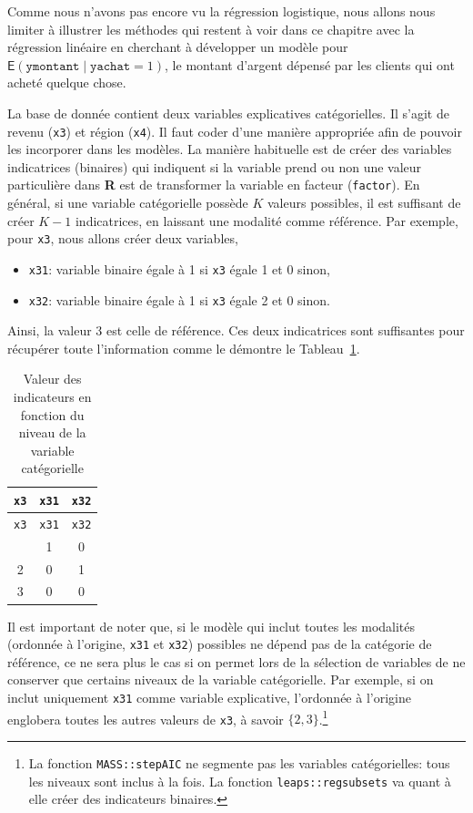 \documentclass[
  11pt,
  letterpaper,
]{scrbook}
\providecommand{\tightlist}{%
  \setlength{\itemsep}{0pt}\setlength{\parskip}{0pt}}\usepackage{longtable,booktabs,array}
\theoremstyle{definition}
\theoremstyle{remark}
\begin{document}
Comme nous n'avons pas encore vu la régression logistique, nous allons
nous limiter à illustrer les méthodes qui restent à voir dans ce
chapitre avec la régression linéaire en cherchant à développer un modèle
pour \(\mathsf{E}(\texttt{ymontant} \mid \texttt{yachat}=1)\), le
montant d'argent dépensé par les clients qui ont acheté quelque chose.

La base de donnée contient deux variables explicatives catégorielles. Il
s'agit de revenu (\texttt{x3}) et région (\texttt{x4}). Il faut coder
d'une manière appropriée afin de pouvoir les incorporer dans les
modèles. La manière habituelle est de créer des variables indicatrices
(binaires) qui indiquent si la variable prend ou non une valeur
particulière dans \textbf{R} est de transformer la variable en facteur
(\texttt{factor}). En général, si une variable catégorielle possède
\(K\) valeurs possibles, il est suffisant de créer \(K-1\) indicatrices,
en laissant une modalité comme référence. Par exemple, pour \texttt{x3},
nous allons créer deux variables,

\begin{itemize}
\tightlist
\item
  \texttt{x31}: variable binaire égale à 1 si \texttt{x3} égale 1 et 0
  sinon,
\item
  \texttt{x32}: variable binaire égale à 1 si \texttt{x3} égale 2 et 0
  sinon.
\end{itemize}

Ainsi, la valeur 3 est celle de référence. Ces deux indicatrices sont
suffisantes pour récupérer toute l'information comme le démontre le
Tableau~\ref{tbl-02-dummy}.

\hypertarget{tbl-02-dummy}{}
\begin{longtable}[]{@{}ccc@{}}
\caption{\label{tbl-02-dummy}Valeur des indicateurs en fonction du
niveau de la variable catégorielle}\tabularnewline
\toprule\noalign{}
\texttt{x3} & \texttt{x31} & \texttt{x32} \\
\midrule\noalign{}
\endfirsthead
\toprule\noalign{}
\texttt{x3} & \texttt{x31} & \texttt{x32} \\
\midrule\noalign{}
\endhead
\bottomrule\noalign{}
\endlastfoot
1 & 1 & 0 \\
2 & 0 & 1 \\
3 & 0 & 0 \\
\end{longtable}

Il est important de noter que, si le modèle qui inclut toutes les
modalités (ordonnée à l'origine, \texttt{x31} et \texttt{x32}) possibles
ne dépend pas de la catégorie de référence, ce ne sera plus le cas si on
permet lors de la sélection de variables de ne conserver que certains
niveaux de la variable catégorielle. Par exemple, si on inclut
uniquement \texttt{x31} comme variable explicative, l'ordonnée à
l'origine englobera toutes les autres valeurs de \texttt{x3}, à savoir
\(\{2, 3\}\).\footnote{La fonction \texttt{MASS::stepAIC} ne segmente
  pas les variables catégorielles: tous les niveaux sont inclus à la
  fois. La fonction \texttt{leaps::regsubsets} va quant à elle créer des
  indicateurs binaires.}
\end{document}
